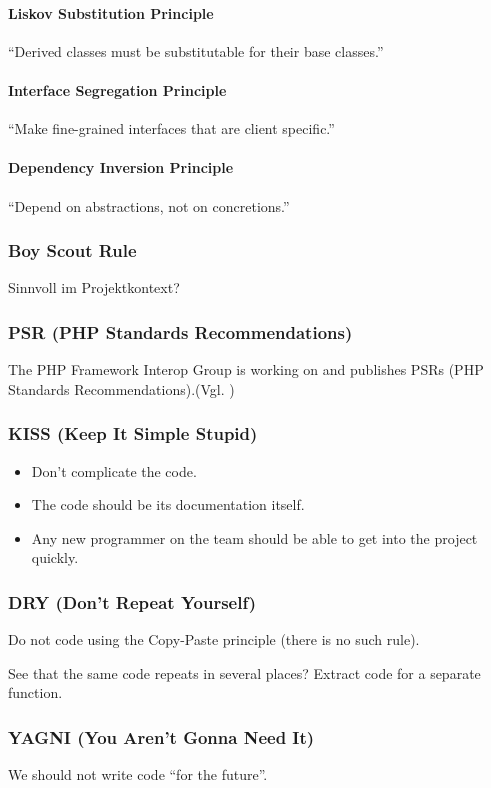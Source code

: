 \paragraph{Liskov Substitution Principle}
\enquote{Derived classes must be substitutable for their base classes.}\cite{solid}

\paragraph{Interface Segregation Principle}
\enquote{Make fine-grained interfaces that are client specific.}\cite{solid}

\paragraph{Dependency Inversion Principle}
\enquote{Depend on abstractions, not on concretions.}\cite{solid}

\subsubsection{Boy Scout Rule}
Sinnvoll im Projektkontext?
\subsubsection{PSR (PHP Standards Recommendations)}
The PHP Framework Interop Group is working on and publishes PSRs (PHP Standards Recommendations).(Vgl. \cite{psr})

\subsubsection{KISS (Keep It Simple Stupid)}
\begin{itemize}
    \item Don't complicate the code.
    \item The code should be its documentation itself.
    \item Any new programmer on the team should be able to get into the project quickly.
\end{itemize}
\subsubsection{DRY (Don’t Repeat Yourself)}
Do not code using the Copy-Paste principle (there is no such rule).

See that the same code repeats in several places? Extract code for a separate function.
\subsubsection{YAGNI (You Aren’t Gonna Need It)}
We should not write code “for the future”.

